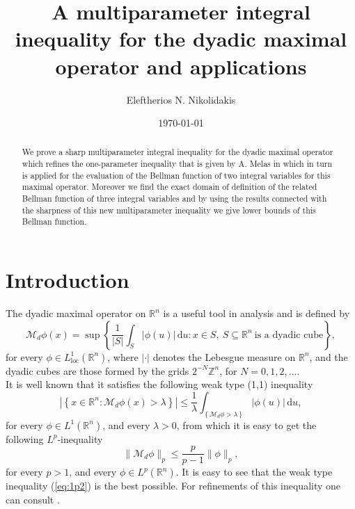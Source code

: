\documentclass{article}
\title{A multiparameter integral inequality for the dyadic maximal operator and applications}
\author{Eleftherios N. Nikolidakis}
\date{\today}
\numberwithin{equation}{section}
\theoremstyle{definition}
\theoremstyle{remark}
\newcommand{\mr}[1]{\mathrm{#1}}
\newcommand{\mb}[1]{\mathbb{#1}}
\newcommand{\mc}[1]{\mathcal{#1}}
\begin{document}
\maketitle

\begin{abstract}
We prove a sharp multiparameter integral inequality for the dyadic maximal operator which refines the one-parameter inequality that is given by A. Melas in \cite{M} which in turn is applied for the evaluation of the Bellman function of two integral variables for this maximal operator. Moreover we find the exact domain of definition of the related Bellman function of three integral variables and by using the results connected with the sharpness of this new multiparameter inequality we give lower bounds of this Bellman function.
\end{abstract}



\section{Introduction} \label{sec:1}
The dyadic maximal operator on $\mb R^n$ is a useful tool in analysis and is defined by
\begin{equation} \label{eq:1p1}
\mc M_d\phi(x) = \sup\left\{ \frac{1}{|S|} \int_S |\phi(u)|\,\mr du: x\in S,\ S\subseteq \mb R^n\ \text{is a dyadic cube} \right\},
\end{equation}
for every $\phi\in L^1_\text{loc}(\mb R^n)$, where $|\cdot|$ denotes the Lebesgue measure on $\mb R^n$, and the dyadic cubes are those formed by the grids $2^{-N}\mb Z^n$, for $N=0, 1, 2, \ldots$.\\
%
It is well known that it satisfies the following weak type (1,1) inequality
\begin{equation} \label{eq:1p2}
\left|\left\{ x\in\mb R^n: \mc M_d\phi(x) > \lambda \right\}\right| \leq \frac{1}{\lambda} \int_{\left\{\mc M_d\phi > \lambda\right\}} |\phi(u)|\,\mr du,
\end{equation}
for every $\phi\in L^1(\mb R^n)$, and every $\lambda>0$,
%
from which it is easy to get the following  $L^p$-inequality
\begin{equation} \label{eq:1p3}
\|\mc M_d\phi\|_p \leq \frac{p}{p-1} \|\phi\|_p,
\end{equation}
for every $p>1$, and every $\phi\in L^p(\mb R^n)$.
It is easy to see that the weak type inequality (\ref{eq:1p2}) is the best possible. For refinements of this inequality one can consult \cite{N6}.
\end{document}
